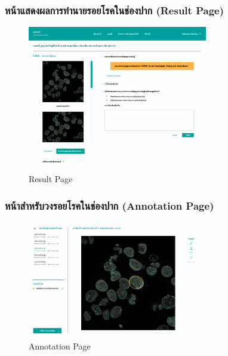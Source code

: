 \newpage
\subsubsection{หน้าแสดงผลการทำนายรอยโรคในช่องปาก (Result Page)}
\begin{figure}[h]
    \begin{center}
        \includegraphics[width=0.7\textwidth]{img/user/predictionPage-5.png}
    \end{center}
    \caption[Poem]{Result Page}
    \label{fig:result}
\end{figure}

\newpage
\subsubsection{หน้าสำหรับวงรอยโรคในช่องปาก (Annotation Page)}
\begin{figure}[h]
    \begin{center}
        \includegraphics[width=0.7\textwidth]{img/user/6-annotation-page.png}
    \end{center}
    \caption[Poem]{Annotation Page}
    \label{fig:annotation}
\end{figure}

